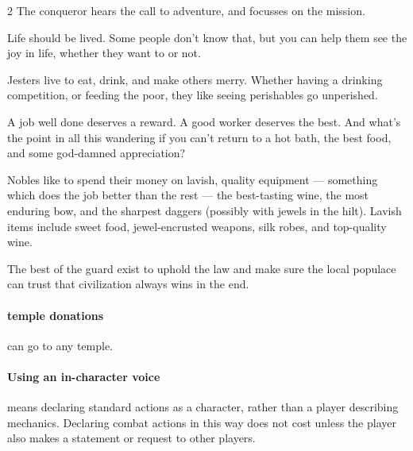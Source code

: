 \begin{multicols}{2}
The conqueror hears the call to adventure, and focusses on the mission.

\showCodeValues


\begin{speechtext}
  Life should be lived.
  Some people don't know that, but you can help them see the joy in life, whether they want to or not.
\end{speechtext}

Jesters live to eat, drink, and make others merry.
Whether having a drinking competition, or feeding the poor, they like seeing perishables go unperished.

\showCodeValues


\begin{speechtext}
  A job well done deserves a reward.
  A good worker deserves the best.
  And what's the point in all this wandering if you can't return to a hot bath, the best food, and some god-damned appreciation?
\end{speechtext}

Nobles like to spend their money on lavish, quality equipment --- something which does the job better than the rest --- the best-tasting wine, the most enduring bow, and the sharpest daggers (possibly with jewels in the hilt).
Lavish items include sweet food, jewel-encrusted weapons, silk robes, and top-quality wine.

\showCodeValues


The best of the \gls{guard} exist to uphold the law and make sure the local populace can trust that civilization always wins in the end.

\showCodeValues

\paragraph{\Gls{temple} donations}
can go to any \gls{temple}.

\paragraph{Using an in-character voice}
means declaring standard \glspl{action} as a character, rather than a player describing mechanics.
Declaring combat actions in this way does not cost  unless the player also makes a statement or request to other players.


\end{multicols}
